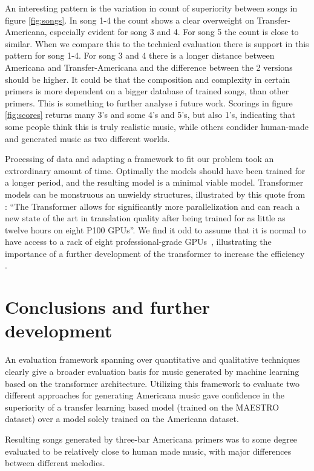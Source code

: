 \documentclass{IEEEtran}
\begin{document}
An interesting pattern is the variation in count of superiority between songs
in figure \ref{fig:songs}. In song 1-4 the count shows a clear overweight on
Transfer-Americana, especially evident for song 3 and 4. For song 5 the count
is close to similar. When we compare this to the technical evaluation there is 
support in this pattern for song 1-4. For song 3 and 4 there is a longer distance 
between Americana and Transfer-Americana and the difference between the 2 versions 
should be higher. It could be that the composition and complexity in
certain primers is more dependent on a bigger database of trained songs, than
other primers. This is something to further analyse i future work. Scorings
in figure \ref{fig:scores} returns many 3's and some 4's and 5's, but also
1's, indicating that some people think this is truly realistic music, while
others condider human-made and generated music as two different worlds.

Processing of data and adapting a framework to fit our problem 
took an extrordinary amount of time. Optimally the models should have been
trained for a longer period, and the resulting model is a minimal viable model.
Transformer models can be monstruous 
an unwieldy structures, illustrated by this quote from
\citeauthor{vaswani2017attention}: ``The Transformer allows for significantly
more parallelization and can reach a new state of the art in translation
quality after being trained for as little as twelve hours on eight P100 GPUs''.
We find it odd to assume that it is normal to have access to a rack of eight 
professional-grade GPUs~\cite{vaswani2017attention}, illustrating the importance
of a further development of the transformer to increase the efficiency 
\cite{kitaev2020reformer}.

\section{Conclusions and further development}

An evaluation framework spanning over quantitative and qualitative techniques
clearly give a broader evaluation basis for music generated by machine learning 
based on the transformer architecture. Utilizing this framework to evaluate two different 
approaches for generating Americana music gave confidence in the superiority of a 
transfer learning based model (trained on the MAESTRO dataset) over a model solely
trained on the Americana dataset.

Resulting songs generated by three-bar Americana primers was to some degree evaluated to 
be relatively close to human made music, with major differences between different melodies.
\end{document}
